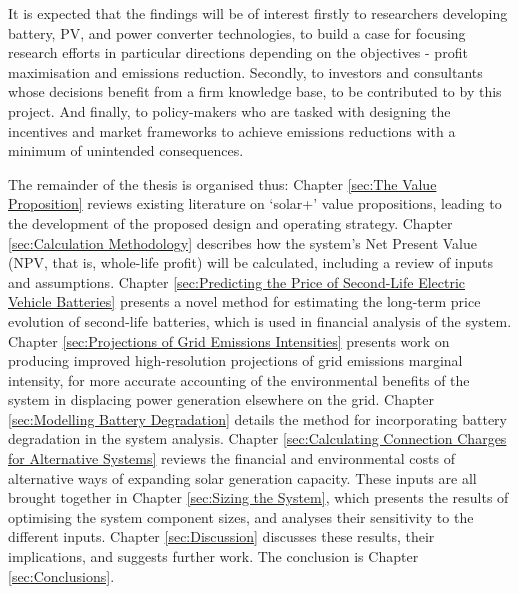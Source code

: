 \documentclass[report_18month.tex]{subfiles}
\begin{document}
It is expected that the findings will be of interest firstly to researchers developing battery, PV, and power converter technologies, to build a case for focusing research efforts in particular directions depending on the objectives - profit maximisation and emissions reduction. Secondly, to investors and consultants whose decisions benefit from a firm knowledge base, to be contributed to by this project. And finally, to policy-makers who are tasked with designing the incentives and market frameworks to achieve emissions reductions with a minimum of unintended consequences.

The remainder of the thesis is organised thus: Chapter \ref{sec:The Value Proposition} reviews existing literature on `solar+' value propositions, leading to the development of the proposed design and operating strategy. Chapter \ref{sec:Calculation Methodology} describes how the system's Net Present Value (NPV, that is, whole-life profit) will be calculated, including a review of inputs and assumptions. Chapter \ref{sec:Predicting the Price of Second-Life Electric Vehicle Batteries} presents a novel method for estimating the long-term price evolution of second-life batteries, which is used in financial analysis of the system. Chapter \ref{sec:Projections of Grid Emissions Intensities} presents work on producing improved high-resolution projections of grid emissions marginal intensity, for more accurate accounting of the environmental benefits of the system in displacing power generation elsewhere on the grid. Chapter \ref{sec:Modelling Battery Degradation} details the method for incorporating battery degradation in the system analysis. Chapter \ref{sec:Calculating Connection Charges for Alternative Systems} reviews the financial and environmental costs of alternative ways of expanding solar generation capacity. These inputs are all brought together in Chapter \ref{sec:Sizing the System}, which presents the results of optimising the system component sizes, and analyses their sensitivity to the different inputs. Chapter \ref{sec:Discussion} discusses these results, their implications, and suggests further work. The conclusion is Chapter \ref{sec:Conclusions}.
\end{document}
